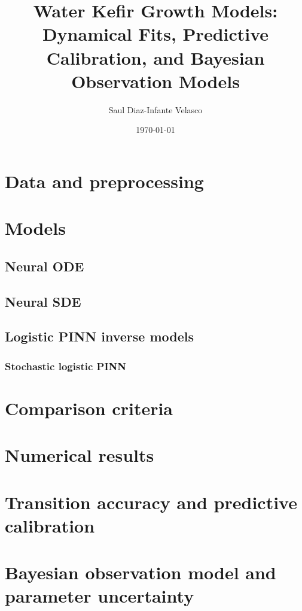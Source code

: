 \documentclass[11pt]{amsart}
\title[Water Kefir Growth Models]{
    Water Kefir Growth Models:
    Dynamical Fits, Predictive Calibration,
    and Bayesian Observation Models
}
\author{Saul Diaz-Infante Velasco}
\date{\today}
\begin{document}
    
    \maketitle
    \clearpage
    \tableofcontents
    \clearpage
    \section{Data and preprocessing}
        
    \section{Models}
        
    \subsection{Neural ODE}
        
    \subsection{Neural SDE}
        
    \subsection{Logistic PINN inverse models}
            
        \subsubsection{Stochastic logistic PINN}
            
    \section{Comparison criteria}
        
    \section{Numerical results}
        
    \clearpage
    \section{Transition accuracy and predictive calibration}
        
    \clearpage
    \section{Bayesian observation model and parameter uncertainty}
        
    \clearpage
\end{document}

